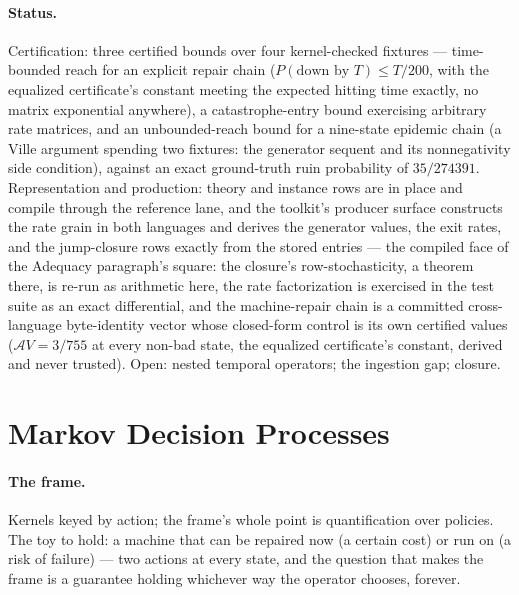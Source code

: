 \paragraph{Status.} Certification: three certified bounds over four
kernel-checked fixtures --- time-bounded reach for an explicit repair
chain ($P(\text{down by } T) \le T/200$, with the equalized
certificate's constant meeting the expected hitting time exactly, no
matrix exponential anywhere), a catastrophe-entry bound exercising
arbitrary rate matrices, and an unbounded-reach bound for a
nine-state epidemic chain (a Ville argument spending two fixtures:
the generator sequent and its nonnegativity side condition), against
an exact ground-truth ruin probability of $35/274391$. Representation
and production: theory and instance rows are in place and compile
through the reference lane, and the toolkit's producer surface
constructs the rate grain in both languages and derives the
generator values, the exit rates, and the jump-closure rows exactly
from the stored entries --- the compiled face of the Adequacy
paragraph's square: the closure's row-stochasticity, a theorem
there, is re-run as arithmetic here, the rate factorization is
exercised in the test suite as an exact differential, and the machine-repair
chain is a committed cross-language byte-identity vector whose
closed-form control is its own certified values ($\mathcal{A}V =
3/755$ at every non-bad state, the equalized certificate's constant,
derived and never trusted). Open: nested temporal operators;
the ingestion gap; closure.



\section{Markov Decision Processes}
\label{sec:mt-mdp}

\paragraph{The frame.} Kernels keyed by action; the frame's whole
point is quantification over policies. The toy to hold: a machine
that can be repaired now (a certain cost) or run on (a risk of
failure) --- two actions at every state, and the question that makes
the frame is a guarantee holding whichever way the operator chooses,
forever.

